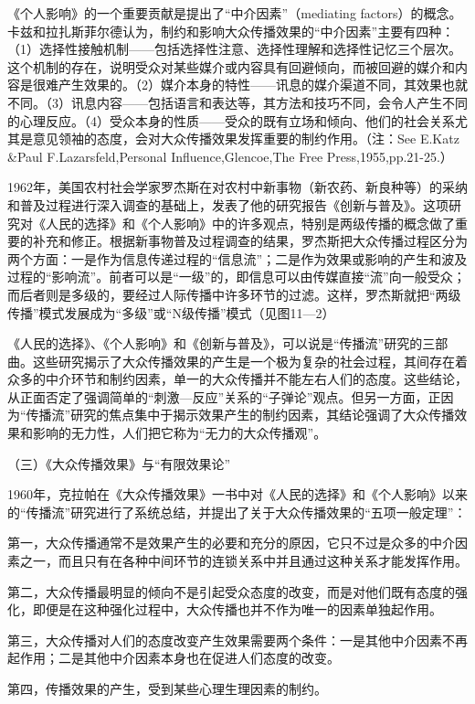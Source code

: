 \documentclass[UTF8,12pt]{ctexart}
\numberwithin{equation}{section} %
\numberwithin{figure}{section}
\numberwithin{table}{section}
\begin{document}
	《个人影响》的一个重要贡献是提出了“中介因素”（mediating factors）的概念。卡兹和拉扎斯菲尔德认为，制约和影响大众传播效果的“中介因素”主要有四种：（1）选择性接触机制——包括选择性注意、选择性理解和选择性记忆三个层次。这个机制的存在，说明受众对某些媒介或内容具有回避倾向，而被回避的媒介和内容是很难产生效果的。（2）媒介本身的特性——讯息的媒介渠道不同，其效果也就不同。（3）讯息内容——包括语言和表达等，其方法和技巧不同，会令人产生不同的心理反应。（4）受众本身的性质——受众的既有立场和倾向、他们的社会关系尤其是意见领袖的态度，会对大众传播效果发挥重要的制约作用。（注：See E.Katz \&Paul F.Lazarsfeld,Personal Influence,Glencoe,The Free Press,1955,pp.21-25.）
	
	1962年，美国农村社会学家罗杰斯在对农村中新事物（新农药、新良种等）的采纳和普及过程进行深入调查的基础上，发表了他的研究报告《创新与普及》。这项研究对《人民的选择》和《个人影响》中的许多观点，特别是两级传播的概念做了重要的补充和修正。根据新事物普及过程调查的结果，罗杰斯把大众传播过程区分为两个方面：一是作为信息传递过程的“信息流”；二是作为效果或影响的产生和波及过程的“影响流”。前者可以是“一级”的，即信息可以由传媒直接“流”向一般受众；而后者则是多级的，要经过人际传播中许多环节的过滤。这样，罗杰斯就把“两级传播”模式发展成为“多级”或“N级传播”模式（见图11—2）
	
	《人民的选择》、《个人影响》和《创新与普及》，可以说是“传播流”研究的三部曲。这些研究揭示了大众传播效果的产生是一个极为复杂的社会过程，其间存在着众多的中介环节和制约因素，单一的大众传播并不能左右人们的态度。这些结论，从正面否定了强调简单的“刺激—反应”关系的“子弹论”观点。但另一方面，正因为“传播流”研究的焦点集中于揭示效果产生的制约因素，其结论强调了大众传播效果和影响的无力性，人们把它称为“无力的大众传播观”。
	
	（三）《大众传播效果》与“有限效果论”
	
	1960年，克拉帕在《大众传播效果》一书中对《人民的选择》和《个人影响》以来的“传播流”研究进行了系统总结，并提出了关于大众传播效果的“五项一般定理”：
	
	第一，大众传播通常不是效果产生的必要和充分的原因，它只不过是众多的中介因素之一，而且只有在各种中间环节的连锁关系中并且通过这种关系才能发挥作用。
	
	第二，大众传播最明显的倾向不是引起受众态度的改变，而是对他们既有态度的强化，即便是在这种强化过程中，大众传播也并不作为唯一的因素单独起作用。
	
	第三，大众传播对人们的态度改变产生效果需要两个条件：一是其他中介因素不再起作用；二是其他中介因素本身也在促进人们态度的改变。
	
	第四，传播效果的产生，受到某些心理生理因素的制约。
	
\end{document}
